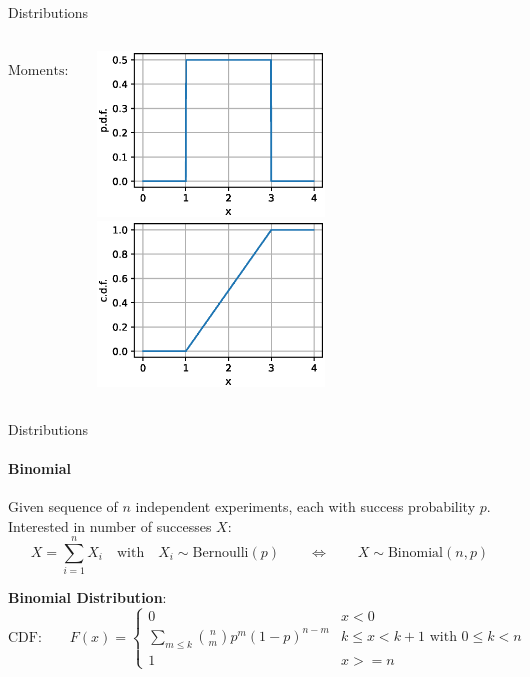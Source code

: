 {\begin{frame}{Distributions}
\begin{columns}[onlytextwidth]
\begin{column}{0.5\textwidth}
\begin{boxed}
                    $$\text{Moments:}\qquad \displaystyle \mu_X = \frac{a+b}{2} \quad \sigma_X^2 = \frac{(b-a)^2}{12}$$
                \end{boxed}
            \end{column}
            \begin{column}{0.5\textwidth}
                \begin{center}
                    \includegraphics[width=0.55\textwidth]{fig/prob_cont_unif_pdf.eps}
                    \includegraphics[width=0.55\textwidth]{fig/prob_cont_unif_cdf.eps}
                \end{center}
            \end{column}
        \end{columns}
    \end{frame}

    \begin{frame}{Distributions}
        \framesubtitle{Binomial}
        \vspace*{-3mm}
        Given sequence of $n$ independent experiments, each with success probability $p$. Interested in
        number of successes $X$:
        $$X = \sum_{i=1}^n X_i \quad \text{with} \quad X_i \sim \mathrm{Bernoulli}(p)
            \qquad \Longleftrightarrow \qquad X \sim \mathrm{Binomial}(n, p)
        $$

        \vspace*{-2mm}
        \begin{boxed}
            \textbf{Binomial Distribution}:
            $$
                \text{CDF:}\qquad F(x) = \begin{cases}
                    0                                          & x < 0                                   \\
                    \sum_{m \le k} \binom{n}{m} p^m(1-p)^{n-m} & k \le x < k+1 \text{ with } 0 \le k < n \\
                    1                                          & x >= n
                \end{cases}
            $$


\end{boxed}
\end{frame}}

